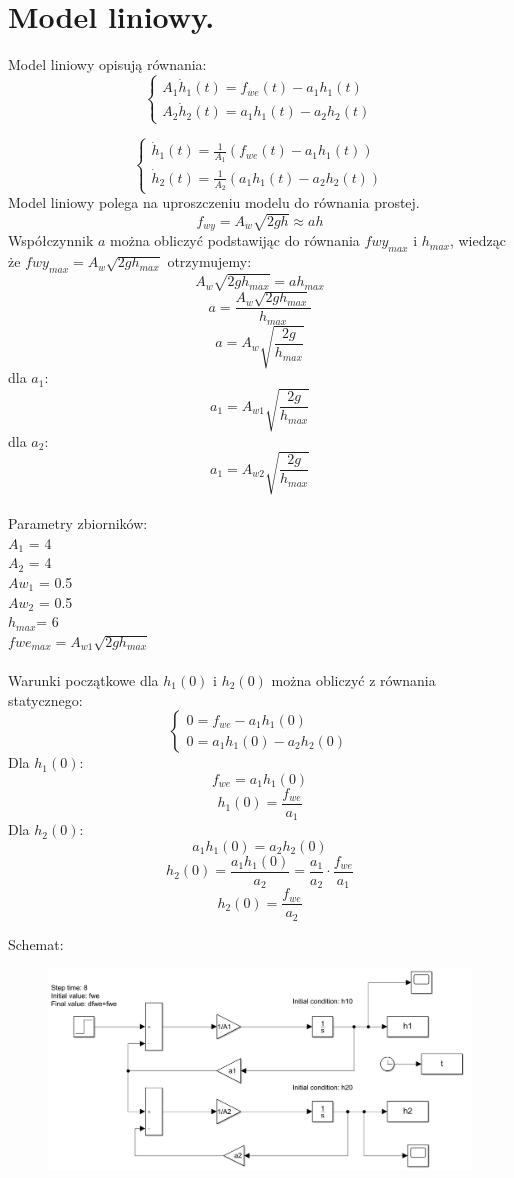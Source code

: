 \documentclass{article}
\begin{document}
\section{Model liniowy.}
Model liniowy opisują równania:
$$ 
 \begin{cases}
    A_1\dot h_{1}(t)=f_{we}(t)-a_{1}h_1(t)\\
    A_2\dot h_{2}(t)=a_{1}h_1(t)-a_{2}h_2(t)
  \end{cases}
$$

$$ 
  \begin{cases}
    \dot h_{1}(t)=\frac{1}{A_1} \left(f_{we}(t)-a_{1}h_1(t)\right)\\
    \dot h_{2}(t)= \frac{1}{A_{2}} \left( a_{1}h_1(t)-a_{2}h_2(t)\right)
  \end{cases}
 $$
 Model liniowy polega na uproszczeniu modelu do równania prostej.
 $$
f_{wy}=A_{w}\sqrt{2gh}\approx ah
 $$
 Współczynnik $a$ można obliczyć podstawijąc do równania $fwy_{max}$ i $h_{max}$, wiedząc że $fwy_{max}=A_{w}\sqrt{2gh_{max}}$  otrzymujemy:
 $$
 A_{w}\sqrt{2gh_{max}}=ah_{max}
 $$
 $$
 a=\frac{A_{w}\sqrt{2gh_{max}}}{h_{max}}
 $$
 $$
 a=A_{w}\sqrt{\frac{2g}{h_{max}}}
 $$
 dla $a_1$:
 $$
 a_1=A_{w1}\sqrt{\frac{2g}{h_{max}}}
 $$
 dla $a_2$:
 $$
  a_1=A_{w2}\sqrt{\frac{2g}{h_{max}}}
 $$
 \\
 Parametry zbiorników:\\             
$A_1$ = 4 \\
$A_2$ = 4  \\
$Aw_1$ = 0.5  \\
$Aw_2$ = 0.5\\
$h_{max}$= 6 \\
$fwe_{max}=A_{w1}\sqrt{2gh_{max}}$\\\\
Warunki początkowe dla $h_1(0)$ i $h_2(0)$ można obliczyć z równania statycznego:
$$
    \begin{cases}
    0=f_{we}-a_{1}h_1(0)\\
    0=a_{1}h_1(0)-a_{2}h_2(0)
  \end{cases}
 $$
 Dla $h_1(0):$
 $$
 f_{we}=a_1h_1(0)
 $$
 $$
 h_1(0)=\frac{f_{we}}{a_1}
 $$
 Dla $h_2(0):$
 $$
 a_{1}h_1(0)=a_{2}h_2(0)
 $$
 $$
 h_2(0)=\frac{a_{1}h_1(0)}{a_{2}}=\frac{a_1}{a_2}\cdot\frac{f_{we}}{a_1}
 $$
 $$
 h_2(0)=\frac{f_{we}}{a_2}
 $$
 
 \begin{flushleft}
 Schemat:\\
 \end{flushleft}
 \begin{figure}[h!]
    \centering
    \includegraphics[width=1\textwidth]{sL.png}
    \label{fig:my_label}
\end{figure}
\end{document}
